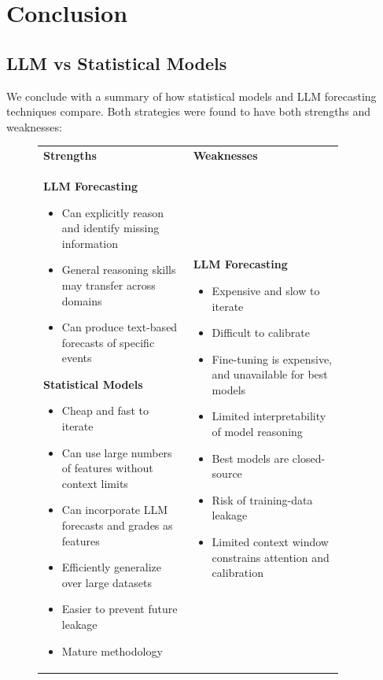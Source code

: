 \section{Conclusion}
\subsection{LLM vs Statistical Models}
We conclude with a summary of how statistical models and LLM forecasting techniques compare. Both strategies were found to have both strengths and weaknesses:
\begin{figure}[!htbp]
\centering
\renewcommand{\arraystretch}{1.3}
\begin{tabular}{p{0.45\linewidth} p{0.45\linewidth}}

\textbf{Strengths} &
\textbf{Weaknesses} \\

\textbf{LLM Forecasting}
\begin{itemize}[noitemsep,topsep=0pt]
  \item Can explicitly reason and identify missing information
  \item General reasoning skills may transfer across domains
  \item Can produce text-based forecasts of specific events
\end{itemize}

\textbf{Statistical Models}
\begin{itemize}[noitemsep,topsep=0pt]
  \item Cheap and fast to iterate
  \item Can use large numbers of features without context limits
  \item Can incorporate LLM forecasts and grades as features
  \item Efficiently generalize over large datasets
  \item Easier to prevent future leakage
  \item Mature methodology
\end{itemize}

&
\textbf{LLM Forecasting}
\begin{itemize}[noitemsep,topsep=0pt]
  \item Expensive and slow to iterate
  \item Difficult to calibrate
  \item Fine-tuning is expensive, and unavailable for best models
  \item Limited interpretability of model reasoning
  \item Best models are closed-source
  \item Risk of training-data leakage
  \item Limited context window constrains attention and calibration
\end{itemize}


\end{tabular}
\end{figure}
